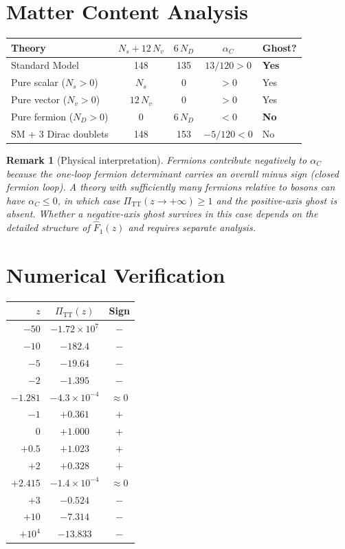 \documentclass[11pt,a4paper]{article}
\newcommand{\PiTT}{\Pi_{\mathrm{TT}}}
\newcommand{\Fhat}{\hat{F}}
\newtheorem{remark}[theorem]{Remark}
\begin{document}
\section{Matter Content Analysis}

\begin{center}
\begin{tabular}{lcccl}
\toprule
Theory & $N_s + 12\,N_v$ & $6\,N_D$ & $\alpha_C$ & Ghost? \\
\midrule
Standard Model & 148 & 135 & $13/120 > 0$ & \textbf{Yes} \\
Pure scalar ($N_s > 0$) & $N_s$ & 0 & $> 0$ & Yes \\
Pure vector ($N_v > 0$) & $12\,N_v$ & 0 & $> 0$ & Yes \\
Pure fermion ($N_D > 0$) & 0 & $6\,N_D$ & $< 0$ & \textbf{No} \\
SM + 3 Dirac doublets & 148 & 153 & $-5/120 < 0$ & No \\
\bottomrule
\end{tabular}
\end{center}

\begin{remark}[Physical interpretation]
Fermions contribute \emph{negatively} to $\alpha_C$ because the
one-loop fermion determinant carries an overall minus sign (closed
fermion loop).  A theory with sufficiently many fermions relative to
bosons can have $\alpha_C \leq 0$, in which case
$\PiTT(z \to +\infty) \geq 1$ and the positive-axis ghost is absent.
Whether a negative-axis ghost survives in this case depends on the
detailed structure of $\Fhat_1(z)$ and requires separate analysis.
\end{remark}


\section{Numerical Verification}

\begin{center}
\begin{tabular}{rcc}
\toprule
$z$ & $\PiTT(z)$ & Sign \\
\midrule
$-50$ & $-1.72 \times 10^7$ & $-$ \\
$-10$ & $-182.4$ & $-$ \\
$-5$ & $-19.64$ & $-$ \\
$-2$ & $-1.395$ & $-$ \\
$-1.281$ & $-4.3 \times 10^{-4}$ & $\approx 0$ \\
$-1$ & $+0.361$ & $+$ \\
$0$ & $+1.000$ & $+$ \\
$+0.5$ & $+1.023$ & $+$ \\
$+2$ & $+0.328$ & $+$ \\
$+2.415$ & $-1.4 \times 10^{-4}$ & $\approx 0$ \\
$+3$ & $-0.524$ & $-$ \\
$+10$ & $-7.314$ & $-$ \\
$+10^4$ & $-13.833$ & $-$ \\
\bottomrule
\end{tabular}
\end{center}
\end{document}

